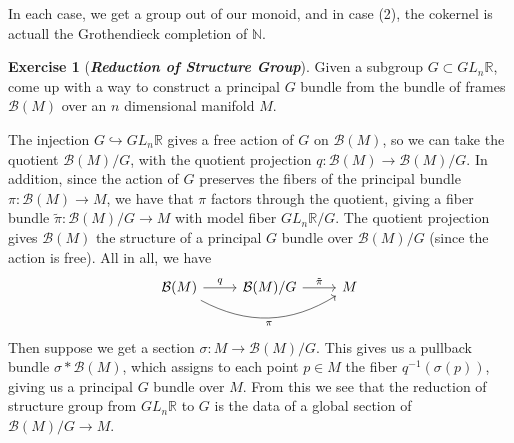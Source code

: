\documentclass[psamsfonts]{amsart}
\theoremstyle{definition}
\newtheorem{exer}[thm]{Exercise}
\theoremstyle{remark}
\newcommand{\R}{\mathbb{R}}
\newcommand{\ib}[1]{\textbf{\textit{#1}}}
\newcommand{\N}{\mathbb{N}}
\newcommand{\B}{\mathcal{B}}
\newcommand{\inv}{^{-1}}
\begin{document}
%
In each case, we get a group out of our monoid, and in case (2), the cokernel is actuall the Grothendieck completion of $\N$.
%
\begin{exer}[\ib{Reduction of Structure Group}]
Given a subgroup $G \subset GL_n\R$, come up with a way to construct a principal $G$ bundle from the bundle of frames $\B(M)$ over an $n$ dimensional manifold $M$.
\end{exer}
%
The injection $G \hookrightarrow GL_n\R$ gives a free action of $G$ on $\B(M)$, so we can take the quotient $\B(M) / G$, with the quotient projection $q : \B(M) \to \B(M) / G$. In addition, since the action of $G$ preserves the fibers of the principal bundle $\pi : \B(M) \to M$, we have that $\pi$ factors through the quotient, giving a fiber bundle $\tilde{\pi}: \B(M) / G \to M$ with model fiber $GL_n\R / G$. The quotient projection gives $\B(M)$ the structure of a principal $G$ bundle over $\B(M) / G$ (since the action is free). All in all, we have 
\[
\begin{tikzcd}
\B(M) \ar[r, "q"] \ar[rr, bend right=30, "\pi"'] & \B(M) / G \ar[r, "\tilde{\pi}"] & M
\end{tikzcd}
\]
Then suppose we get a section $\sigma : M \to \B(M) / G$. This gives us a pullback bundle $\sigma*\B(M)$, which assigns to each point $p \in M$ the fiber $q\inv(\sigma(p))$, giving us a principal $G$ bundle over $M$. From this we see that the reduction of structure group from $GL_n\R$ to $G$ is the data of a global section of $\B(M) / G \to M$.
%
\end{document}
